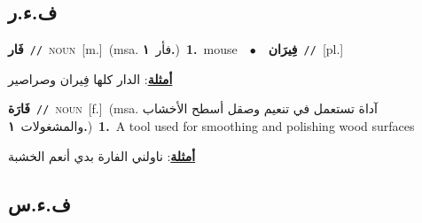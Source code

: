 \documentclass[10pt,a4paper,twoside]{article} %
\begin{document}
\begin{multicols}{2}
\vspace{-3mm}
\subsection*{\color{blue}\foreignlanguage{arabic}{ف.ء.ر}\color{blue}{}} 

{\setlength\topsep{0pt}\textbf{\foreignlanguage{arabic}{فَار}}\ {\color{gray}\texttt{//}\color{black}}\ \textsc{noun}\ [m.]\ \color{gray}(msa. \foreignlanguage{arabic}{فأر}~\foreignlanguage{arabic}{\textbf{١.}})\color{black}\ \textbf{1.}~mouse\ \ $\bullet$\ \ \setlength\topsep{0pt}\textbf{\foreignlanguage{arabic}{فِيرَان}}\ {\color{gray}\texttt{//}\color{black}}\ [pl.]\  \begin{flushright}\color{gray}\foreignlanguage{arabic}{\textbf{\underline{\foreignlanguage{arabic}{أمثلة}}}: الدار كلها فِيران وصراصير}\end{flushright}\color{black}} \vspace{2mm}

{\setlength\topsep{0pt}\textbf{\foreignlanguage{arabic}{فَارَة}}\ {\color{gray}\texttt{//}\color{black}}\ \textsc{noun}\ [f.]\ \color{gray}(msa. \foreignlanguage{arabic}{آداة تستعمل في تنعيم وصقل أسطح الأخشاب والمشغولات}~\foreignlanguage{arabic}{\textbf{١.}})\color{black}\ \textbf{1.}~A tool used for smoothing and polishing wood surfaces\  \begin{flushright}\color{gray}\foreignlanguage{arabic}{\textbf{\underline{\foreignlanguage{arabic}{أمثلة}}}: ناولني الفارة بدي أنعم الخشبة}\end{flushright}\color{black}} \vspace{2mm}

\vspace{-3mm}
\subsection*{\color{blue}\foreignlanguage{arabic}{ف.ء.س}\color{blue}{}} 


\end{multicols}
\end{document}
